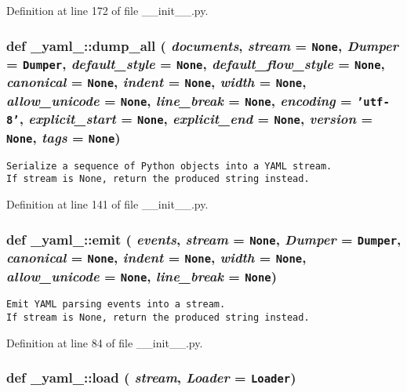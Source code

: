 Definition at line 172 of file \_\-\_\-init\_\-\_\-.py.
\subsubsection{\setlength{\rightskip}{0pt plus 5cm}def \_\-yaml\_\-::dump\_\-all ( {\em documents},  {\em stream} = {\tt None},  {\em Dumper} = {\tt Dumper},  {\em default\_\-style} = {\tt None},  {\em default\_\-flow\_\-style} = {\tt None},  {\em canonical} = {\tt None},  {\em indent} = {\tt None},  {\em width} = {\tt None},  {\em allow\_\-unicode} = {\tt None},  {\em line\_\-break} = {\tt None},  {\em encoding} = {\tt 'utf-8'},  {\em explicit\_\-start} = {\tt None},  {\em explicit\_\-end} = {\tt None},  {\em version} = {\tt None},  {\em tags} = {\tt None})}\label{namespace__yaml___11942e5f83e05f082a77ef383e30d67d}




\footnotesize\begin{verbatim}
Serialize a sequence of Python objects into a YAML stream.
If stream is None, return the produced string instead.
\end{verbatim}
\normalsize
 

Definition at line 141 of file \_\-\_\-init\_\-\_\-.py.
\subsubsection{\setlength{\rightskip}{0pt plus 5cm}def \_\-yaml\_\-::emit ( {\em events},  {\em stream} = {\tt None},  {\em Dumper} = {\tt Dumper},  {\em canonical} = {\tt None},  {\em indent} = {\tt None},  {\em width} = {\tt None},  {\em allow\_\-unicode} = {\tt None},  {\em line\_\-break} = {\tt None})}\label{namespace__yaml___d6ef975a53ceb3baefc0061770ac93e9}




\footnotesize\begin{verbatim}
Emit YAML parsing events into a stream.
If stream is None, return the produced string instead.
\end{verbatim}
\normalsize
 

Definition at line 84 of file \_\-\_\-init\_\-\_\-.py.
\subsubsection{\setlength{\rightskip}{0pt plus 5cm}def \_\-yaml\_\-::load ( {\em stream},  {\em Loader} = {\tt Loader})}\label{namespace__yaml___51adc825e36a32baf5370741d919ad80}




